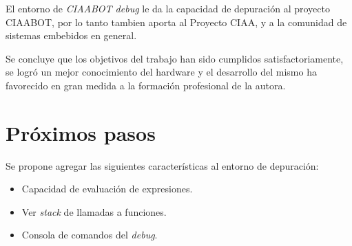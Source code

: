 El entorno de \emph{CIAABOT debug} le da la capacidad de depuración al proyecto CIAABOT, por lo tanto tambien aporta al Proyecto CIAA, y a la comunidad de sistemas embebidos en general.

Se concluye que los objetivos del trabajo han sido cumplidos satisfactoriamente, se logró un mejor conocimiento del hardware y el desarrollo del mismo ha favorecido en
gran medida a la formación profesional de la autora.


\section{Próximos pasos}

Se propone agregar las siguientes características al entorno de depuración:

\begin{itemize}
	\item Capacidad de evaluación de expresiones.
	\item Ver \emph{stack} de llamadas a funciones.
	\item Consola de comandos del \emph{debug}.
\end{itemize}
